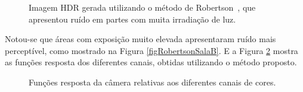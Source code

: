 \begin{figure}[H]
  \centering
  \quad %
  \caption{Imagem HDR gerada utilizando o método de Robertson~\etal, que apresentou ruído em partes com muita irradiação de luz.}
  \label{figRobertsonSala}
\end{figure}

Notou-se que áreas com exposição muito elevada apresentaram ruído mais perceptível, como mostrado na Figura \ref{figRobertsonSalaB}. E a Figura \ref{figRobertsonFR} mostra as funções resposta dos diferentes canais, obtidas utilizando o método proposto.

\begin{figure}[H]
  \centering
  \quad %
  \caption{Funções resposta da câmera relativas aos diferentes canais de cores.}
  \label{figRobertsonFR}
\end{figure}

